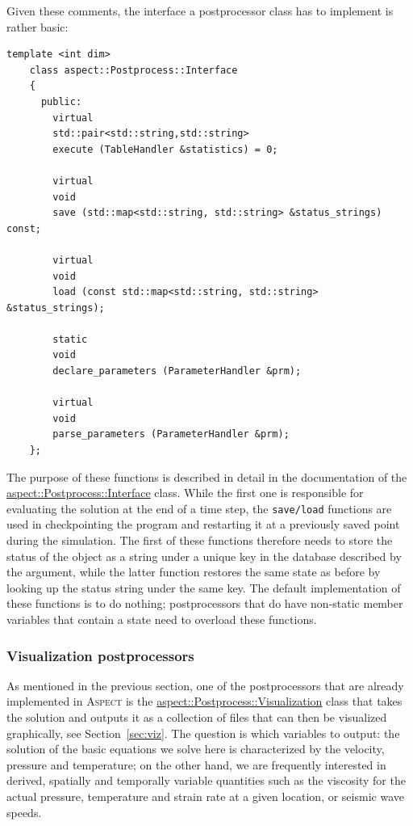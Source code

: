 \documentclass{article}
\newcommand{\aspect}{\textsc{Aspect}}
\begin{document}
Given these comments, the interface a postprocessor class has to implement is
rather basic:
\begin{lstlisting}[frame=single]
    template <int dim>
    class aspect::Postprocess::Interface
    {
      public:
        virtual
        std::pair<std::string,std::string>
        execute (TableHandler &statistics) = 0;

        virtual
        void
        save (std::map<std::string, std::string> &status_strings) const;

        virtual
        void
        load (const std::map<std::string, std::string> &status_strings);

        static
        void
        declare_parameters (ParameterHandler &prm);

        virtual
        void
        parse_parameters (ParameterHandler &prm);
    };
\end{lstlisting}
The purpose of these functions is described in detail in the documentation of
the
\href{doc/doxygen/classaspect_1_1Postprocess_1_1Interface.html}{aspect::Postprocess::Interface}
class. While the first one is responsible for evaluating the solution at the
end of a time step, the \texttt{save/load} functions are used in checkpointing
the program and restarting it at a previously saved point during the
simulation. The first of these functions therefore needs to store the status
of the object as a string under a unique key in the database described by the
argument, while the latter function restores the same state as before by
looking up the status string under the same key. The default implementation of
these functions is to do nothing; postprocessors that do have non-static
member variables that contain a state need to overload these functions.


\subsubsection{Visualization postprocessors}
\label{sec:viz-postpostprocessors}

As mentioned in the previous section, one of the postprocessors that are
already implemented in \aspect{} is the \href{doc/doxygen/classaspect_1_1Postprocess_1_1Visualization.html}{aspect::Postprocess::Visualization}
class that takes the solution and outputs it as a collection of files that can
then be visualized graphically, see Section~\ref{sec:viz}. The question is
which variables to output: the solution of the basic equations we solve here
is characterized by the velocity, pressure and temperature; on the other hand,
we are frequently interested in derived, spatially and temporally variable
quantities such as the viscosity for the actual pressure, temperature and
strain rate at a given location, or seismic wave speeds.
\end{document}

